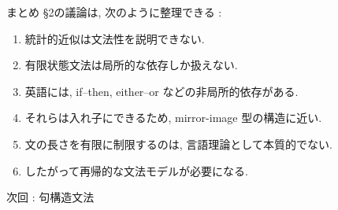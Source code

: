 \documentclass[dvipdfmx, xcolor={dvipsnames},12pt]{beamer}
\begin{document}
\begin{frame}{まとめ}
\S2の議論は, 次のように整理できる :

\begin{enumerate}
  \item 統計的近似は文法性を説明できない.
  \item 有限状態文法は局所的な依存しか扱えない.
  \item 英語には, if--then, either--or などの非局所的依存がある.
  \item それらは入れ子にできるため, mirror-image 型の構造に近い.
  \item 文の長さを有限に制限するのは, 言語理論として本質的でない.
  \item したがって再帰的な文法モデルが必要になる.
\end{enumerate}
次回 : 句構造文法

\end{frame}
\end{document}
